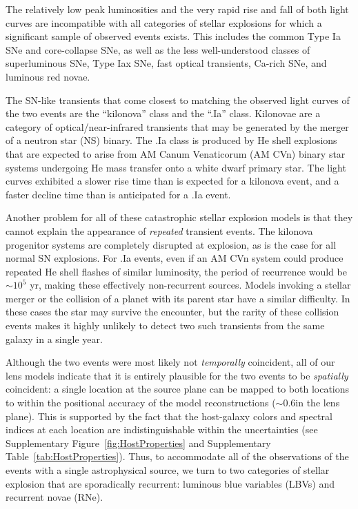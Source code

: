 The relatively low peak luminosities and the very rapid rise and fall
of both \spock light curves are incompatible with all categories of
stellar explosions for which a significant sample of observed events
exists.  This includes the common Type Ia SNe and core-collapse SNe,
as well as the less well-understood classes of superluminous
SNe\cite{Gal-Yam:2012}, Type Iax SNe\citep{Foley:2013a}, fast optical
transients\cite{Drout:2014}, Ca-rich SNe\cite{Kasliwal:2012}, and
luminous red novae\cite{Kulkarni:2007}.  

The SN-like transients that come closest to matching the observed
light curves of the two \spock events are the ``kilonova'' class and
the ``.Ia'' class.  Kilonovae are a category of optical/near-infrared
transients that may be generated by the merger of a neutron star (NS)
binary\cite{Li:1998, Tanvir:2013, Jin:2016}.  The .Ia class is
produced by He shell explosions that are expected to arise from AM
Canum Venaticorum (AM CVn) binary star systems undergoing He mass
transfer onto a white dwarf primary star\cite{Bildsten:2007}.  The
\spock light curves exhibited a slower rise time than is expected for
a kilonova event\cite{Barnes:2013, Kasen:2015}, and a faster decline
time than is anticipated for a .Ia event\cite{Shen:2010}.

Another problem for all of these catastrophic stellar explosion models
is that they cannot explain the appearance of {\it repeated} transient
events.  The kilonova progenitor systems are completely disrupted at
explosion, as is the case for all normal SN explosions.  For .Ia
events, even if an AM CVn system could produce repeated He shell
flashes of similar luminosity, the period of recurrence would be
$\sim10^5$ yr, making these effectively non-recurrent sources.  Models
invoking a stellar merger or the collision of a planet with its parent
star have a similar difficulty.  In these cases the star may survive
the encounter, but the rarity of these collision events makes it
highly unlikely to detect two such transients from the same galaxy in
a single year.

Although the two events were most likely not {\it temporally}
coincident, all of our lens models indicate that it is entirely
plausible for the two \spock events to be {\it spatially} coincident:
a single location at the source plane can be mapped to both \spock
locations to within the positional accuracy of the model
reconstructions ($\sim$0.6\arcsec in the lens plane). This is
supported by the fact that the host-galaxy colors and spectral indices
at each \spock location are indistinguishable within the uncertainties
(see Supplementary Figure~\ref{fig:HostProperties} and Supplementary
Table~\ref{tab:HostProperties}).  Thus, to accommodate all of the
observations of the \spock events with a single astrophysical source,
we turn to two categories of stellar explosion that are sporadically
recurrent: luminous blue variables (LBVs) and recurrent novae (RNe).


